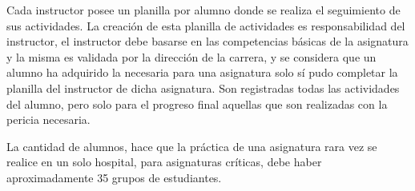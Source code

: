 Cada instructor posee un planilla por alumno donde se realiza el seguimiento de
sus actividades. La creación de esta planilla de actividades es responsabilidad
del instructor, el instructor debe basarse en las competencias básicas de la
asignatura y la misma es validada por la dirección de la carrera, y se considera
que un alumno ha adquirido la  necesaria para una asignatura solo sí pudo
completar la planilla del instructor de dicha asignatura. Son registradas todas
las actividades del alumno, pero solo  para el progreso final aquellas que son realizadas con
la pericia necesaria.

La cantidad de alumnos, hace que la práctica de una asignatura rara vez se
realice en un solo hospital, para asignaturas críticas, debe haber
aproximadamente 35 grupos de estudiantes.

